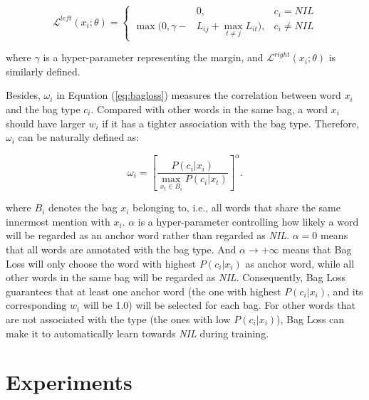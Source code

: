 \documentclass[11pt,a4paper]{article}
\begin{document}
\begin{small}
\begin{equation}
\mathcal{L}^{left}(x_i;\theta)=\left\{
\begin{aligned}
&0,&c_i = NIL \\
\max(0,\gamma - & L_{ij} + \max_{t \neq j}L_{it}),&c_i \neq NIL
\end{aligned}
\right.
\label{eq:marginloss}
\end{equation}
\end{small}where $\gamma$ is a hyper-parameter representing the margin, and $\mathcal{L}^{right}(x_i;\theta)$ is similarly defined.

Besides, $\omega_i$ in Equation (\ref{eq:bagloss}) measures the correlation between word $x_i$ and the bag type $c_i$. Compared with other words in the same bag, a word $x_i$ should have larger $w_i$ if it has a tighter association with the bag type. Therefore, $\omega_i$ can be naturally defined as:

\begin{small}
\begin{equation}
\omega_i = [\frac{P(c_{i}|x_i)}{\max_{x_t \in B_i} P(c_{i}|x_t)}]^{\alpha}.
\label{eq:weight}
\end{equation}
\end{small}where $B_i$ denotes the bag $x_i$ belonging to, i.e., all words that share the same innermost mention with $x_i$. $\alpha$ is a hyper-parameter controlling how likely a word will be regarded as an anchor word rather than regarded as \emph{NIL}. $\alpha=0$ means that all words are annotated with the bag type. And $\alpha \to +\infty$ means that Bag Loss will only choose the word with highest $P(c_i|x_i)$ as anchor word, while all other words in the same bag will be regarded as \emph{NIL}. Consequently, Bag Loss guarantees that at least one anchor word (the one with highest $P(c_{i}|x_i)$, and its corresponding $w_i$ will be 1.0) will be selected for each bag. For other words that are not associated with the type (the ones with low $P(c_{i}|x_i)$), Bag Loss can make it to automatically learn towards \emph{NIL} during training. 



\section{Experiments}
\end{document}
